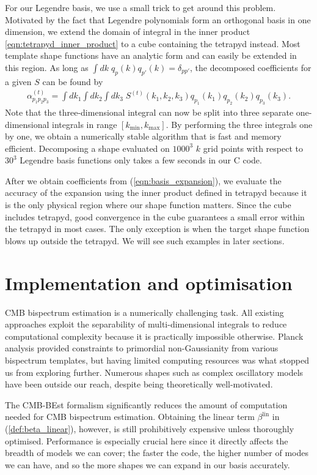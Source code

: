 For our Legendre basis, we use a small trick to get around this problem. Motivated by the fact that Legendre polynomials form an orthogonal basis in one dimension, we extend the domain of integral in the inner product \eqref{eqn:tetrapyd_inner_product} to a cube containing the tetrapyd instead. Most template shape functions have an analytic form and can easily be extended in this region. As long as $\int dk \; q_p(k) q_{p'}(k) = \delta_{pp'}$, the decomposed coefficients for a given $S$ can be found by
\begin{align}
	\alpha^{(t)}_{p_1 p_2 p_3} = \int dk_1 \int dk_2 \int dk_3 \; S^{(t)}(k_1, k_2, k_3) q_{p_1}(k_1) q_{p_2}(k_2) q_{p_3}(k_3). \label{eqn:basis_expansion}
\end{align}
Note that the three-dimensional integral can now be split into three separate one-dimensional integrals in range $[k_\text{min}, k_\text{max}]$. By performing the three integrals one by one, we obtain a numerically stable algorithm that is fast and memory efficient. Decomposing a shape evaluated on $1000^3$ $k$ grid points with respect to $30^3$ Legendre basis functions only takes a few seconds in our \textsc{C} code.

After we obtain coefficients from (\ref{eqn:basis_expansion}), we evaluate the accuracy of the expansion using the inner product defined in tetrapyd because it is the only physical region where our shape function matters. Since the cube includes tetrapyd, good convergence in the cube guarantees a small error within the tetrapyd in most cases. The only exception is when the target shape function blows up outside the tetrapyd. We will see such examples in later sections.


\section{Implementation and optimisation} \label{section:implementation}

CMB bispectrum estimation is a numerically challenging task. All existing approaches exploit the separability of multi-dimensional integrals to reduce computational complexity because it is practically impossible otherwise. Planck analysis provided constraints to primordial non-Gaussianity from various bispectrum templates, but having limited computing resources was what stopped us from exploring further. Numerous shapes such as complex oscillatory models have been outside our reach, despite being theoretically well-motivated.

The CMB-BEst formalism significantly reduces the amount of computation needed for CMB bispectrum estimation. Obtaining the linear term $\beta^\text{lin}$ in (\ref{def:beta_linear}), however, is still prohibitively expensive unless thoroughly optimised. Performance is especially crucial here since it directly affects the breadth of models we can cover; the faster the code, the higher number of modes we can have, and so the more shapes we can expand in our basis accurately.

